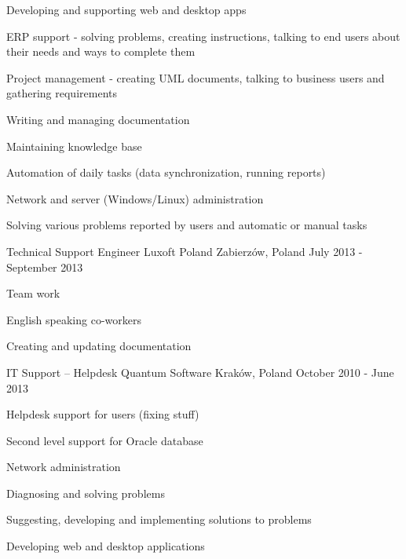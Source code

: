 \begin{cventries}
{\begin{cvitems}
	 			\item {Developing and supporting web and desktop apps}
				\item {ERP support - solving problems, creating instructions, talking to end users about their needs and ways to complete them}
				\item {Project management - creating \textsc{UML} documents, talking to business users and gathering requirements}
				\item {Writing and managing documentation}
				\item {Maintaining knowledge base}
				\item {Automation of daily tasks (data synchronization, running reports)}
				\item {Network and server (Windows/Linux) administration}
				\item {Solving various problems reported by users and automatic or manual tasks}
			\end{cvitems}
		}
	\cventry
		{Technical Support Engineer}
		{Luxoft Poland}
		{Zabierzów, Poland}
		{July 2013 - September 2013}
		{
			\begin{cvitems}
				\item {Team work}
			 	\item {English speaking co-workers}
			 	\item {Creating and updating documentation}
			\end{cvitems} 
		}
	\cventry
		{IT Support -- Helpdesk}
		{Quantum Software}
		{Kraków, Poland}
		{October 2010 - June 2013}
		{
			\begin{cvitems}
				\item {Helpdesk support for users (fixing stuff)}
				\item {Second level support for Oracle database}
				\item {Network administration}
				\item {Diagnosing and solving problems}
				\item {Suggesting, developing and implementing solutions to problems}
				\item {Developing web and desktop applications}
			\end{cvitems}
		}
\end{cventries}
